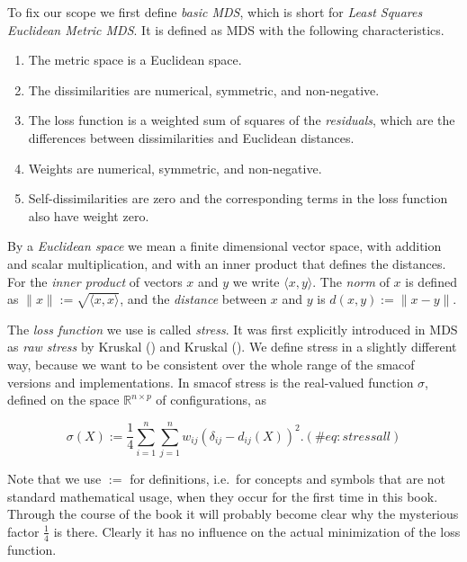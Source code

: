 \documentclass[
  12pt,
  letterpaper,
  DIV=11,
  numbers=noendperiod]{scrartcl}
\providecommand{\tightlist}{%
  \setlength{\itemsep}{0pt}\setlength{\parskip}{0pt}}\usepackage{longtable,booktabs,array}
\begin{document}
To fix our scope we first define \emph{basic MDS}, which is short for
\emph{Least Squares Euclidean Metric MDS}. It is defined as MDS with the
following characteristics.

\begin{enumerate}
\def\labelenumi{\arabic{enumi}.}
\tightlist
\item
  The metric space is a Euclidean space.
\item
  The dissimilarities are numerical, symmetric, and non-negative.
\item
  The loss function is a weighted sum of squares of the
  \emph{residuals}, which are the differences between dissimilarities
  and Euclidean distances.
\item
  Weights are numerical, symmetric, and non-negative.
\item
  Self-dissimilarities are zero and the corresponding terms in the loss
  function also have weight zero.
\end{enumerate}

By a \emph{Euclidean space} we mean a finite dimensional vector space,
with addition and scalar multiplication, and with an inner product that
defines the distances. For the \emph{inner product} of vectors \(x\) and
\(y\) we write \(\langle x,y\rangle\). The \emph{norm} of \(x\) is
defined as \(\|x\|:=\sqrt{\langle x,x\rangle}\), and the \emph{distance}
between \(x\) and \(y\) is \(d(x,y):=\|x-y\|\).

The \emph{loss function} we use is called \emph{stress}. It was first
explicitly introduced in MDS as \emph{raw stress} by Kruskal
() and Kruskal
(). We define stress in a slightly
different way, because we want to be consistent over the whole range of
the smacof versions and implementations. In smacof stress is the
real-valued function \(\sigma\), defined on the space
\(\mathbb{R}^{n\times p}\) of configurations, as

\begin{equation}
\sigma(X):=\frac14\sum_{i=1}^n\sum_{j=1}^n w_{ij}(\delta_{ij}-d_{ij}(X))^2.
(\#eq:stressall)
\end{equation}

Note that we use \(:=\) for definitions, i.e.~for concepts and symbols
that are not standard mathematical usage, when they occur for the first
time in this book. Through the course of the book it will probably
become clear why the mysterious factor \(\frac14\) is there. Clearly it
has no influence on the actual minimization of the loss function.
\end{document}

